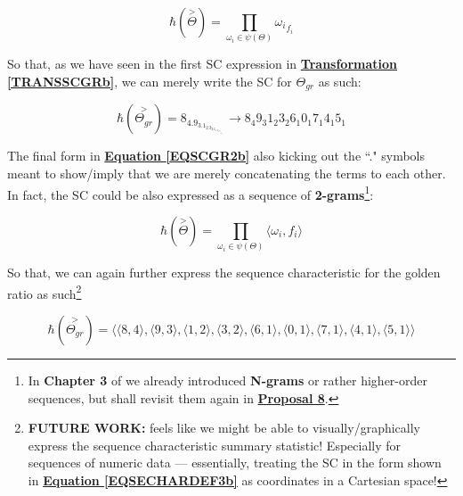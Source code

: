 \documentclass[a4paper, 18pt]{book} %
\begin{document}
\begin{appendices}
\vspace{1em}
\begin{equation}
\label{EQSECHARDEF2b}
 \hbar(\overset{>}{\Theta}) = \prod\limits_{\omega_i \in \psi(\Theta)} {\omega_i}_{f_i}
\end{equation}
\vspace{1em}

So that, as we have seen in the first SC expression in  \textbf{\hyperref[TRANSSCGRb]{Transformation \ref{TRANSSCGRb}}}, we can merely write the SC for $\Theta_{gr}$ as such:

\vspace{1em}
\begin{equation}
\label{EQSCGR2b}
 \hbar(\overset{>}{\Theta_{gr}}) = 8_4.9_3.1_2.3_2.6_1.0_1.7_1.4_1.5_1 \rightarrow 8_4 9_3 1_2 3_2 6_1 0_1 7_1 4_1 5_1
\end{equation}
\vspace{1em}

The final form in \textbf{\hyperref[EQSCGR2b]{Equation \ref{EQSCGR2b}}} also kicking out the ``." symbols meant to show/imply that we are merely concatenating the terms to each other. In fact, the SC could be also expressed as a sequence of \textbf{2-grams}\footnote{In \textbf{Chapter 3} of \cite{lutalo_2025_trans_genetics} we already introduced \textbf{N-grams} or rather higher-order sequences, but shall revisit them again in \textbf{\hyperref[PROP8]{Proposal 8}}.}:

\vspace{1em}
\begin{equation}
\label{EQSECHARDEF3b}
 \hbar(\overset{>}{\Theta}) = \prod\limits_{\omega_i \in \psi(\Theta)} \langle \omega_i, f_i \rangle
\end{equation}
\vspace{1em}

So that, we can again further express the sequence characteristic for the golden ratio as such\footnote{\textbf{FUTURE WORK:} feels like we might be able to visually/graphically express the sequence characteristic summary statistic! Especially for sequences of numeric data --- essentially, treating the SC in the form shown in \textbf{\hyperref[EQSECHARDEF3b]{Equation \ref{EQSECHARDEF3b}}} as coordinates in a Cartesian space!}

\vspace{1em}
\begin{equation}
\label{EQSCGR3b}
 \hbar(\overset{>}{\Theta_{gr}}) = \langle \langle 8, 4 \rangle, \langle 9, 3 \rangle, \langle 1, 2 \rangle, \langle 3, 2 \rangle, \langle 6, 1 \rangle, \langle 0, 1 \rangle, \langle 7, 1 \rangle, \langle 4, 1 \rangle, \langle 5, 1 \rangle \rangle 
\end{equation}
\vspace{1em}



\end{appendices}
\end{document}

